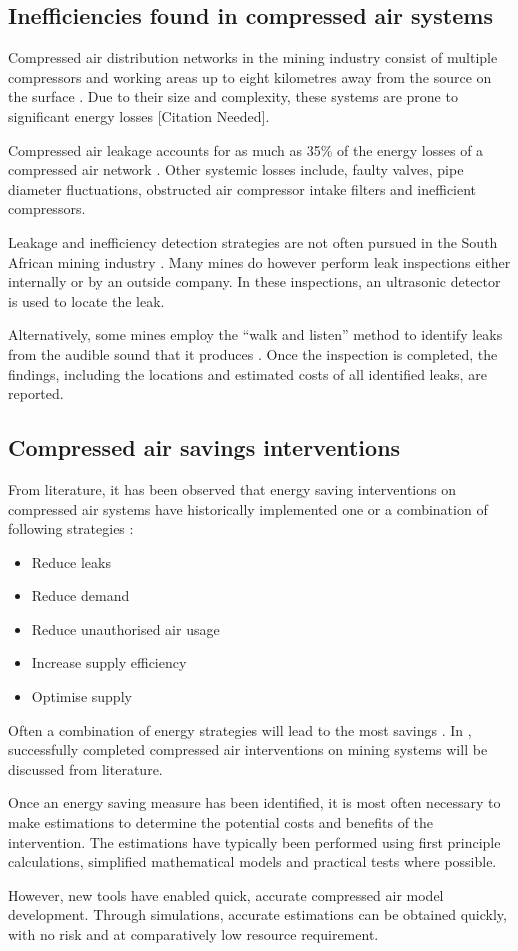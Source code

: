 	\subsection{Inefficiencies found in compressed air systems}
		Compressed air distribution networks in the mining industry consist of multiple compressors and working areas up to eight kilometres away from the source on the surface \cite{Marais2012PhD}. Due to their size and complexity, these systems are prone to significant energy losses [Citation Needed].
		\par 
		Compressed air leakage accounts for as much as 35\% of the energy losses of a compressed air network \cite{Lawrence2004Improving}. Other systemic losses include, faulty valves, pipe diameter fluctuations, obstructed air compressor intake filters and inefficient compressors. 	
		\par
		Leakage and inefficiency detection strategies are not often pursued in the South African mining industry \cite{vanTonder2010Masters}. Many mines do however perform leak inspections either internally or by an outside company. In these inspections, an ultrasonic detector is used to locate the leak. 
		\par 
		Alternatively, some mines employ the \enquote{walk and listen} method to identify leaks from the audible sound that it produces \cite{vanTonder2010Masters}. Once the inspection is completed, the findings, including the locations and estimated costs of all identified leaks, are reported.
		
	\subsection{Compressed air savings interventions}
		From literature, it has been observed that energy saving interventions on compressed air systems have historically implemented one or a combination of following strategies \cite{Snyman2011Masters}:
		\begin{itemize}
			\item Reduce leaks
			\item Reduce demand
			\item Reduce unauthorised air usage
			\item Increase supply efficiency
			\item Optimise supply
		\end{itemize}
	 Often a combination of energy strategies will lead to the most savings \cite{Marais2012PhD}. In , successfully completed compressed air interventions on mining systems will be discussed from literature.
	 \par 
	 Once an energy saving measure has been identified, it is most often necessary to make estimations to determine the potential costs and benefits of the intervention. The estimations have typically been performed using first principle calculations, simplified mathematical models and practical tests where possible. 
	 \par 
	 However, new tools have enabled quick, accurate compressed air model development. Through simulations, accurate estimations can be obtained quickly, with no risk and at comparatively low resource requirement.
